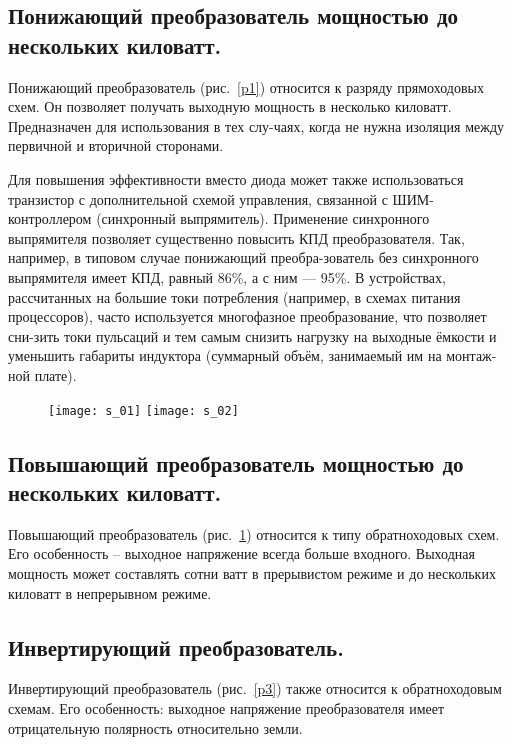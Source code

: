 \subsection{Понижающий преобразователь мощностью до нескольких киловатт.}

	Понижающий преобразователь (рис.~\ref{p1}) относится к разряду прямоходовых схем. Он позволяет получать выходную мощность в несколько киловатт. Предназначен для использования в тех слу-чаях, когда не нужна изоляция между первичной и вторичной сторонами.
	
	Для повышения эффективности вместо диода может также использоваться транзистор с дополнительной схемой управления, связанной с ШИМ-контроллером (синхронный выпрямитель). 
Применение синхронного выпрямителя позволяет существенно повысить КПД преобразователя. Так, например, в типовом случае понижающий преобра-зователь без синхронного выпрямителя имеет КПД, 
равный 86\%, а с ним — 95\%. В устройствах, рассчитанных на большие токи потребления (например, в схемах питания процессоров), часто используется 
многофазное преобразование, что позволяет сни-зить токи пульсаций и тем самым снизить нагрузку на выходные ёмкости и уменьшить габариты индуктора (суммарный объём, занимаемый им на монтаж-ной плате).

\begin{figure}[ht]
	\texttt{[image: s\_01]} \hfill
	\texttt{[image: s\_02]}
	\parbox{.45\textwidth}{\caption{}\label{p1}} \hfill
	\parbox{.45\textwidth}{\caption{}\label{p2}}
\end{figure}

\subsection{Повышающий преобразователь мощностью до нескольких 
киловатт.}

	Повышающий преобразователь (рис.~\ref{p2}) относится к типу обратноходовых схем. Его особенность -- выходное напряжение всегда больше входного.  Выходная мощность может составлять 
сотни ватт в прерывистом режиме и до нескольких 
киловатт в непрерывном режиме.

\subsection{Инвертирующий преобразователь.}

	Инвертирующий преобразователь (рис.~\ref{p3}) также относится к обратноходовым схемам. Его особенность: выходное напряжение преобразователя имеет отрицательную полярность относительно земли.
	 
